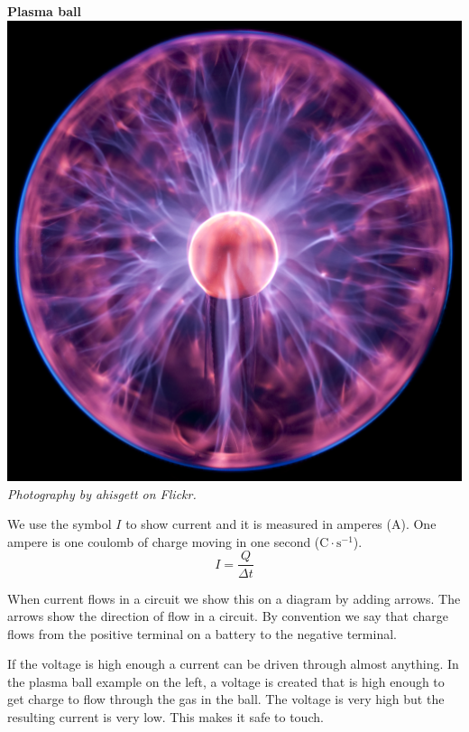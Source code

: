 
\begin{minipage}{.5\textwidth}
\begin{center}
\textbf{Plasma ball}\\
\includegraphics[width=.8\textwidth]{photos/plasmaball_by_ahisgett.jpg}\\
\textit{Photography by ahisgett on Flickr.}
\end{center}   
\end{minipage}
\begin{minipage}{.5\textwidth}
We use the symbol $I$ to show current and it is measured in amperes (A). One ampere is one coulomb of charge moving in one second ($\text{C} \cdot \text{s}^{-1}$).
\begin{equation*}
\boxed{I = \frac{Q}{\Delta t}}
\end{equation*}

When current flows in a circuit we show this on a diagram by adding arrows. The arrows show the direction of flow in a circuit. By convention we say that charge flows from the positive terminal on a battery to the negative terminal. 

If the voltage is high enough a current can be driven through almost anything. In the plasma ball example on the left, a voltage is created that is high enough to get charge to flow through the gas in the ball. The voltage is very high but the resulting current is very low. This makes it safe to touch.
\end{minipage}
